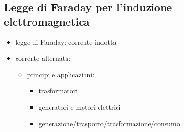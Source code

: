 \documentclass[letterpaper,10pt,italian]{jupyterBook}
\begin{document}
\subsection{Legge di Faraday per l’induzione elettromagnetica}
\label{\detokenize{ch/electromagnetism/electromagnetism-general:legge-di-faraday-per-l-induzione-elettromagnetica}}\label{\detokenize{ch/electromagnetism/electromagnetism-general:physics-hs-electromagnetism-electromagnetism-general-em-induction}}\begin{itemize}
\item {} 
\sphinxAtStartPar
legge di Faraday: corrente indotta

\item {} 
\sphinxAtStartPar
corrente alternata:
\begin{itemize}
\item {} 
\sphinxAtStartPar
principi e applicazioni:
\begin{itemize}
\item {} 
\sphinxAtStartPar
trasformatori

\item {} 
\sphinxAtStartPar
generatori e motori elettrici

\item {} 
\sphinxAtStartPar
generazione/trasporto/trasformazione/consumo

\end{itemize}

\end{itemize}

\end{itemize}
\end{document}
